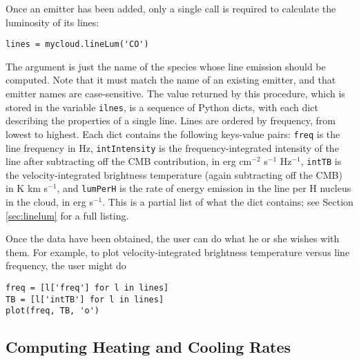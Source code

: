 \documentclass[12pt]{article}
\begin{document}
Once an emitter has been added, only a single call is required to calculate the luminosity of its lines:
\begin{verbatim}
lines = mycloud.lineLum('CO')
\end{verbatim}
The argument is just the name of the species whose line emission should be computed. Note that it must match the name of an existing emitter, and that emitter names are case-sensitive. The value returned by this procedure, which is stored in the variable \verb=ilnes=, is a sequence of Python dicts, with each dict describing the properties of a single line. Lines are ordered by frequency, from lowest to highest. Each dict contains the following keys-value pairs: \verb=freq= is the line frequency in Hz, \verb=intIntensity= is the frequency-integrated intensity of the line after subtracting off the CMB contribution, in erg cm$^{-2}$ s$^{-1}$ Hz$^{-1}$, \verb=intTB= is the velocity-integrated brightness temperature (again subtracting off the CMB) in K km s$^{-1}$, and \verb=lumPerH= is the rate of energy emission in the line per H nucleus in the cloud, in erg s$^{-1}$. This is a partial list of what the dict contains; see Section \ref{sec:linelum} for a full listing.

Once the data have been obtained, the user can do what he or she wishes with them. For example, to plot velocity-integrated brightness temperature versus line frequency, the user might do
\begin{verbatim}
freq = [l['freq'] for l in lines]
TB = [l['intTB'] for l in lines]
plot(freq, TB, 'o')
\end{verbatim}

\subsection{Computing Heating and Cooling Rates}
\end{document}
